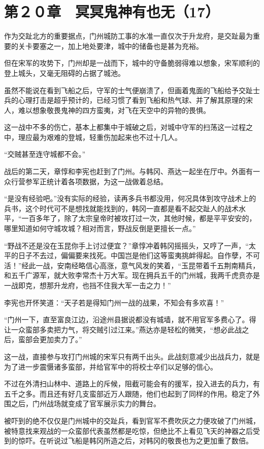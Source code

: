 \section{第２０章　冥冥鬼神有也无（17）}

作为交趾北方的重要据点，门州城防工事的水准一直仅次于升龙府，是交趾最为重要的关卡要塞之一，加上地处要津，城中的储备也是甚为充裕。

但在宋军的攻势下，门州却是一战而下，城中的守备脆弱得难以想象，宋军顺利的登上城头，又毫无阻碍的占据了城池。

虽然不能说在看到飞船之后，守军的士气便崩溃了，但画着鬼面的飞船给予交趾士兵的心理打击是超乎预计的，已经习惯了看到飞船和热气球、并了解其原理的宋人，难以想象敬畏鬼神的四方蛮夷，对飞在天空中的异物的畏惧。

这一战中不多的伤亡，基本上都集中于城破之后，对城中守军的扫荡这一过程之中，理应最为艰难的登城，轻重伤加起来也不过十几人。

“交贼甚至连守城都不会。”

战后的第二天，章惇和李宪也赶到了门州。与韩冈、燕达一起坐在厅中。外面有一众行营参军正统计着各项数据，为这一战做着总结。

“是没有经验吧。”没有实际的经验，读再多兵书都没用，何况具体到攻守战术上的兵书，这个时代可不是想找就能找到的，韩冈一直都是看不起交趾人的战术水平，“一百多年了，除了太宗皇帝时被攻打过一次，其他时候，都是平平安安的，哪里知道如何守城攻城？相对而言，野战反倒是更擅长一点。”

“野战不还是没在玉昆你手上讨过便宜？”章惇冲着韩冈摇摇头，又哼了一声，“太平的日子不去过，偏偏要来找死。中国岂是他们这等蛮夷挑衅得起。自作孽，不可活！”经此一战，安南经略信心高涨，意气风发的笑着，“玉昆带着千五荆南精兵，和五千广源军，就大败李常杰十万大军。现在拥兵五千的门州城，我两千虎贲亦是一战即克，想那升龙府，也挡不住我大军一击之力！”

李宪也开怀笑道：“天子若是得知门州一战的战果，不知会有多欢喜！”

“门州一下，直至富良江边，沿途州县据说都没有城墙，就不用官军多费心了。得让一众蛮部多卖把力气，将交贼引过江来。”燕达亦是轻松的微笑，“想必此战之后，蛮部会更加卖力了。”

这一战，直接参与攻打门州城的宋军只有两千出头。此战刻意减少出战兵力，就是为了进一步震慑诸多蛮部，并给官军中的将校士卒们以足够的信心。

不过在外清扫山林中、道路上的斥候，阻截可能会有的援军，投入进去的兵力，有五千之多。而且还有好几支蛮部近万人跟随，他们也起到了同样的作用。稳定了外围之后，门州战场就变成了官军展示实力的舞台。

被吓到的绝不仅仅是门州城中的交趾兵，看到官军不费吹灰之力便攻破了门州城，被特意找来观战的一众蛮部代表虽然都是吃惊，但绝比不上看见飞天的神器之后受到的惊吓。在听说过飞船是韩冈所造之后，对韩冈的敬畏也为之更加重了数倍。

